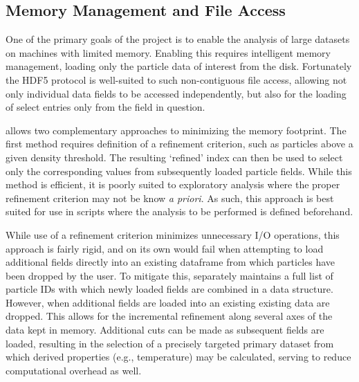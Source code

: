 \subsection{Memory Management and File Access}
\label{sec:fileIO}
One of the primary goals of the  project is to enable the analysis of large datasets on machines with limited memory.
Enabling this requires intelligent memory management, loading only the particle data of interest from the disk.
Fortunately the HDF5 protocol is well-suited to such non-contiguous file access, allowing not only individual data fields to be accessed independently, but also for the loading of select entries only from the field in question.

 allows two complementary approaches to minimizing the memory footprint.
The first method requires definition of a refinement criterion, such as particles above a given density threshold.
The resulting `refined' index can then be used to select only the corresponding values from subsequently loaded particle fields.
While this method is efficient, it is poorly suited to exploratory analysis where the proper refinement criterion may not be know {\it{a priori}}.  As such, this approach is best suited for use in scripts where the analysis to be performed is defined beforehand.

While use of a refinement criterion minimizes unnecessary I/O operations, this approach is fairly rigid, and on its own would fail when attempting to load additional fields directly into an existing  dataframe from which particles have been dropped by the user.
To mitigate this,  separately maintains a full list of particle IDs with which newly loaded fields are combined in a  data structure.  
However, when additional fields are loaded into an existing  existing data are dropped.
This allows for the incremental refinement along several axes of the data kept in memory.
Additional cuts can be made as subsequent fields are loaded, resulting in the selection of a precisely targeted primary dataset from which derived properties (e.g., temperature) may be calculated, serving to reduce computational overhead as well.